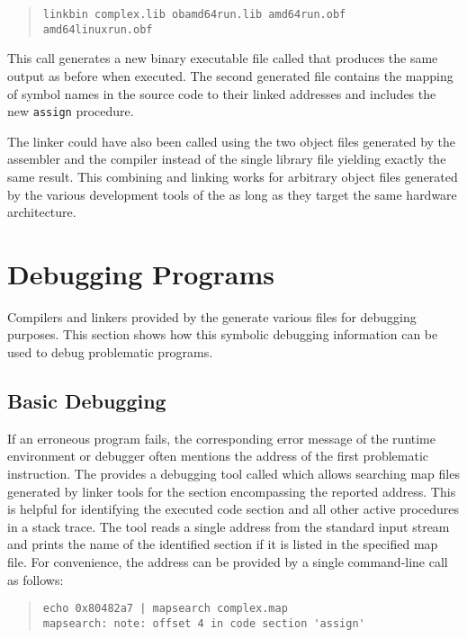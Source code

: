\begin{quote}\begin{verbatim}
linkbin complex.lib obamd64run.lib amd64run.obf amd64linuxrun.obf
\end{verbatim}\end{quote}

This call generates a new binary executable file called  that produces the same output as before when executed.
The second generated file  contains the mapping of symbol names in the source code to their linked addresses and includes the new \texttt{assign} procedure.

The linker could have also been called using the two object files generated by the assembler and the compiler instead of the single library file yielding exactly the same result.
This combining and linking works for arbitrary object files generated by the various development tools of the \ecs{} as long as they target the same hardware architecture.

\section{Debugging Programs}\label{sec:guidedebugging}

Compilers and linkers provided by the \ecs{} generate various files for debugging purposes.
This section shows how this symbolic debugging information can be used to debug problematic programs.

\subsection{Basic Debugging}

If an erroneous program fails, the corresponding error message of the runtime environment or debugger often mentions the address of the first problematic instruction.
The \ecs{} provides a debugging tool called  which allows searching map files generated by linker tools for the section encompassing the reported address.
This is helpful for identifying the executed code section and all other active procedures in a stack trace.
The tool reads a single address from the standard input stream and prints the name of the identified section if it is listed in the specified map file.
For convenience, the address can be provided by a single command-line call as follows:

\begin{quote}\begin{verbatim}
echo 0x80482a7 | mapsearch complex.map
mapsearch: note: offset 4 in code section 'assign'
\end{verbatim}\end{quote}

